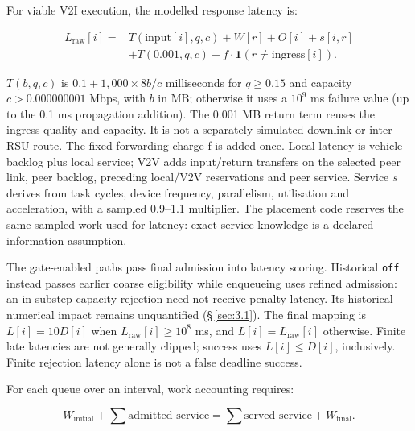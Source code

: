 \documentclass[11pt,a4paper]{article}
\begin{document}
For viable V2I execution, the modelled response latency is:

\begin{equation}\label{eq:4}
 \begin{aligned}
 L_{\mathrm{raw}}[i]={}&T(\mathrm{input}[i],q,c)+W[r]+O[i]+s[i,r]\\
 &+T(0.001,q,c)+f\cdot\mathbf{1}(r\neq\mathrm{ingress}[i]).
 \end{aligned}
\end{equation}

$T(b,q,c)$ is $0.1 + 1{,}000 \times 8b/c$ milliseconds for $q\geq 0.15$ and capacity $c>0.000000001$ Mbps, with $b$ in MB; otherwise it uses a $10^{9}$ ms failure value (up to the 0.1 ms propagation addition). The 0.001 MB return term reuses the ingress quality and capacity. It is not a separately simulated downlink or inter-RSU route. The fixed forwarding charge f is added once. Local latency is vehicle backlog plus local service; V2V adds input/return transfers on the selected peer link, peer backlog, preceding local/V2V reservations and peer service. Service $s$ derives from task cycles, device frequency, parallelism, utilisation and acceleration, with a sampled 0.9--1.1 multiplier. The placement code reserves the same sampled work used for latency: exact service knowledge is a declared information assumption.

The gate-enabled paths pass final admission into latency scoring. Historical \texttt{off} instead passes earlier coarse eligibility while enqueueing uses refined admission: an in-substep capacity rejection need not receive penalty latency. Its historical numerical impact remains unquantified (\S\,\ref{sec:3.1}). The final mapping is $L[i]=10D[i]$ when $L_{\mathrm{raw}}[i]\geq 10^{8}$ ms, and $L[i]=L_{\mathrm{raw}}[i]$ otherwise. Finite late latencies are not generally clipped; success uses $L[i]\leq D[i]$, inclusively. Finite rejection latency alone is not a false deadline success.

For each queue over an interval, work accounting requires:

\begin{equation}\label{eq:5}
 W_{\mathrm{initial}}+\sum\text{admitted service}
 =\sum\text{served service}+W_{\mathrm{final}}.
\end{equation}
\end{document}
